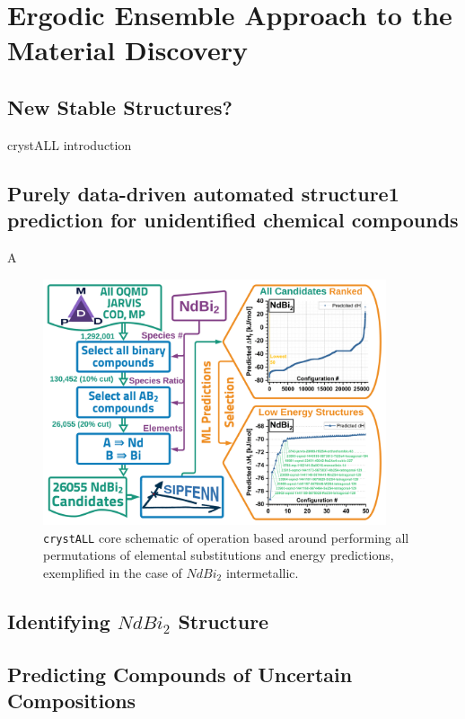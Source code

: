 \chapter{Ergodic Ensemble Approach to the Material Discovery} \label{chap:crystall}

\section{New Stable Structures?} \label{sec:newstable}

crystALL introduction


\section{Purely data-driven automated structure1
prediction for unidentified chemical compounds} \label{sec:crystall}

A

\begin{figure}[h]
    \centering
    \includegraphics[width=0.9\textwidth]{crystall/NdBi2_GraphicalAbstract_V4.png}
    \caption{\texttt{crystALL} core schematic of operation based around performing all permutations of elemental substitutions and energy predictions, exemplified in the case of $NdBi_2$ intermetallic.}
    \label{fig:crystallcompound}
\end{figure}

\section{Identifying $NdBi_2$ Structure} \se


\section{Predicting Compounds of Uncertain Compositions} \label{sec:crystallcompositional}

